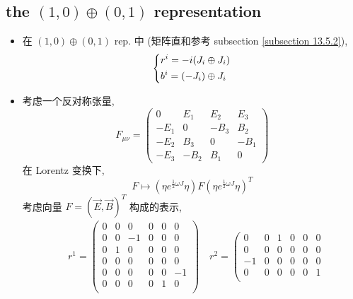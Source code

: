 \subsection{the \texorpdfstring{$(1, 0) \oplus (0, 1)$}{(1, 0)+(0, 1)} representation}
\begin{itemize}
	\item 在 $(1, 0) \oplus (0, 1)$ rep. 中 (矩阵直和参考 subsection \ref{subsection 13.5.2}),
	\begin{equation} \label{13.5.9}
		\begin{dcases}
			r^i = - i (J_i \oplus J_i) \\
			b^i = (- J_i) \oplus J_i
		\end{dcases}
	\end{equation}
	
	\item 考虑一个反对称张量,
	\begin{equation}
		F_{\mu \nu} = \begin{pmatrix}
			0 & E_1 & E_2 & E_3 \\
			- E_1 & 0 & - B_3 & B_2 \\
			- E_2 & B_3 & 0 & - B_1 \\
			- E_3 & - B_2 & B_1 & 0
		\end{pmatrix}
	\end{equation}
	在 Lorentz 变换下,
	\begin{equation}
		F \mapsto (\eta e^{\frac{1}{2} \omega J} \eta) F (\eta e^{\frac{1}{2} \omega J} \eta)^T
	\end{equation}
	考虑向量 $F = (\vec{E}, \vec{B})^T$ 构成的表示,
	\begin{align}
		& r^1 = \left( \begin{array}{ccc|ccc}
			0 & 0 & 0 & 0 & 0 & 0 \\
			0 & 0 & - 1 & 0 & 0 & 0 \\
			0 & 1 & 0 & 0 & 0 & 0 \\
			\hline
			0 & 0 & 0 & 0 & 0 & 0 \\
			0 & 0 & 0 & 0 & 0 & - 1 \\
			0 & 0 & 0 & 0 & 1 & 0 \\
		\end{array} \right) \quad r^2 = \left( \begin{array}{ccc|ccc}
			0 & 0 & 1 & 0 & 0 & 0 \\
			0 & 0 & 0 & 0 & 0 & 0 \\
			- 1 & 0 & 0 & 0 & 0 & 0 \\
			\hline
			0 & 0 & 0 & 0 & 0 & 1 \\

\end{array}
\end{align}
\end{itemize}
